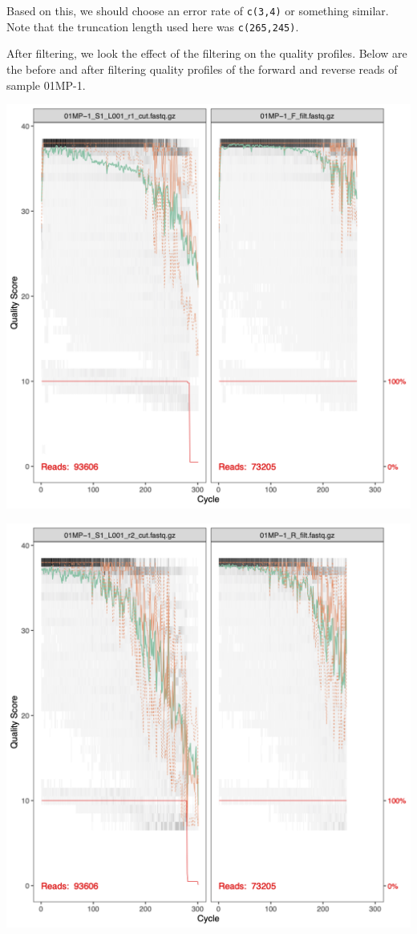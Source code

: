 \documentclass[
]{book}
\begin{document}
Based on this, we should choose an error rate of \texttt{c(3,4)} or something similar. Note that the truncation length used here was \texttt{c(265,245)}.

After filtering, we look the effect of the filtering on the quality profiles. Below are the before and after filtering quality profiles of the forward and reverse reads of sample 01MP-1.

\includegraphics{book/project_files/quality_filt_for_01MP-1.png}

\includegraphics{book/project_files/quality_filt_rev_01MP-1.png}
\end{document}
